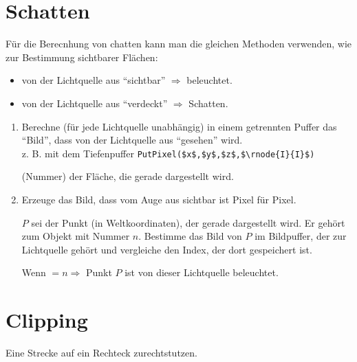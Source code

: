 \chapter{Schatten}
\begin{center}
\end{center}
Für die Berecnhung von chatten kann man die gleichen Methoden verwenden, wie zur Bestimmung sichtbarer Flächen:
\begin{itemize}
 \item von der Lichtquelle aus "`sichtbar"' $\Rightarrow$ beleuchtet.
 \item von der Lichtquelle aus "`verdeckt"' $\Rightarrow$ Schatten.
\end{itemize}
\begin{enumerate}
 \item Berechne (für jede Lichtquelle unabhängig) in einem getrennten Puffer das "`Bild"', dass von der Lichtquelle aus
	"`gesehen"' wird.\\
	z. B. mit dem Tiefenpuffer \lstinline[mathescape=true]!PutPixel($x$,$y$,$z$,$\rnode{I}{I}$)!
	\begin{center}
	  (Nummer) der Fläche, die gerade dargestellt wird.
	 \\
	\end{center}
 \item Erzeuge das Bild, dass vom Auge aus sichtbar ist Pixel für Pixel.
	\begin{center}
	\end{center}
	$P$ sei der Punkt (in Weltkoordinaten), der gerade dargestellt wird. Er gehört zum Objekt mit Nummer $n$.
	Bestimme das Bild von $P$ im Bildpuffer, der zur Lichtquelle gehört und vergleiche den Index, der dort
	gespeichert ist.

	Wenn $= n \Rightarrow $ Punkt $P$ ist von dieser Lichtquelle beleuchtet.
\end{enumerate}
\chapter{Clipping}
Eine Strecke auf ein Rechteck zurechtstutzen.
\begin{center}
\end{center}
